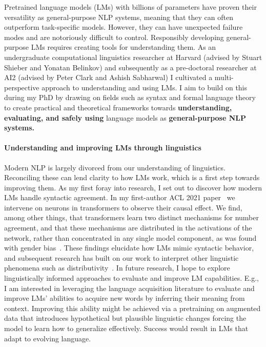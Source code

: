 \documentclass[11pt]{article}
\begin{document}
Pretrained language models (LMs) with billions of parameters 
have proven their versatility 
as general-purpose NLP systems, 
meaning that they can often
outperform task-specific models. 
However, they can have unexpected failure modes 
and are notoriously difficult to control.
Responsibly developing general-purpose LMs
requires creating tools for understanding them.
As an undergraduate computational linguistics researcher at Harvard 
(advised by Stuart Shieber and Yonatan Belinkov)
and subsequently as a pre-doctoral researcher at AI2 
(advised by Peter Clark and Ashish Sabharwal)
I cultivated a multi-perspective approach to understanding and using LMs.
I aim to build on this during my PhD
by drawing on fields such as syntax and formal language theory 
to create practical and theoretical frameworks  
towards \textbf{understanding, evaluating, and safely using} language models 
as \textbf{general-purpose NLP systems.}

\paragraph{Understanding and improving LMs through linguistics}

Modern NLP is largely divorced 
from our understanding of linguistics.
Reconciling these can lend clarity to how LMs work, 
which is a first step towards improving them.
As my first foray into research, I set out to 
discover how modern LMs handle syntactic agreement.
In my first-author ACL 2021 paper~\cite{finlayson-etal-2021-causal}
we intervene on neurons in transformers 
to observe their causal effect.
We find, among other things, that transformers learn 
two distinct mechanisms for number agreement,
and that these mechanisms are distributed 
in the activations of the network, 
rather than concentrated in any single model component,
as was found with gender bias~\cite{Vig2020InvestigatingGB}.
These findings elucidate
how LMs mimic syntactic behavior,
and subsequent research has built on our work 
to interpret other linguistic phenomena 
such as distributivity~\cite{Ban2022TestingPL}.
In future research, I hope to explore 
linguistically informed approaches
to evaluate and improve LM capabilities. 
E.g., I am interested in leveraging 
the language acquisition literature
to evaluate and improve LMs' abilities 
to acquire new words by inferring their meaning from context.
Improving this ability might be achieved 
via a pretraining on augmented data
that introduces hypothetical but plausible linguistic changes
forcing the model to learn how to generalize effectively.
Success would result in LMs that 
adapt to evolving language.
\end{document}
